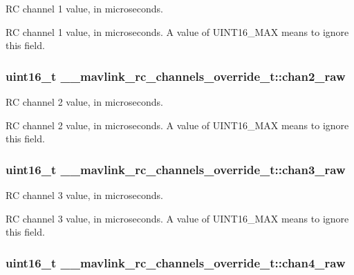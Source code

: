 R\+C channel 1 value, in microseconds. 

R\+C channel 1 value, in microseconds. A value of U\+I\+N\+T16\+\_\+\+M\+A\+X means to ignore this field. \hypertarget{struct____mavlink__rc__channels__override__t_ab3632a873125a666e50f889d854a41d4}{
\subsubsection[{chan2\+\_\+raw}]{\setlength{\rightskip}{0pt plus 5cm}uint16\+\_\+t \+\_\+\+\_\+mavlink\+\_\+rc\+\_\+channels\+\_\+override\+\_\+t\+::chan2\+\_\+raw}}\label{struct____mavlink__rc__channels__override__t_ab3632a873125a666e50f889d854a41d4}


R\+C channel 2 value, in microseconds. 

R\+C channel 2 value, in microseconds. A value of U\+I\+N\+T16\+\_\+\+M\+A\+X means to ignore this field. \hypertarget{struct____mavlink__rc__channels__override__t_aaf6d972bf21b65c73095fc5c45aff71a}{
\subsubsection[{chan3\+\_\+raw}]{\setlength{\rightskip}{0pt plus 5cm}uint16\+\_\+t \+\_\+\+\_\+mavlink\+\_\+rc\+\_\+channels\+\_\+override\+\_\+t\+::chan3\+\_\+raw}}\label{struct____mavlink__rc__channels__override__t_aaf6d972bf21b65c73095fc5c45aff71a}


R\+C channel 3 value, in microseconds. 

R\+C channel 3 value, in microseconds. A value of U\+I\+N\+T16\+\_\+\+M\+A\+X means to ignore this field. \hypertarget{struct____mavlink__rc__channels__override__t_afc315c11bfffdd9aa051799c5d2d0fae}{
\subsubsection[{chan4\+\_\+raw}]{\setlength{\rightskip}{0pt plus 5cm}uint16\+\_\+t \+\_\+\+\_\+mavlink\+\_\+rc\+\_\+channels\+\_\+override\+\_\+t\+::chan4\+\_\+raw}}\label{struct____mavlink__rc__channels__override__t_afc315c11bfffdd9aa051799c5d2d0fae}


